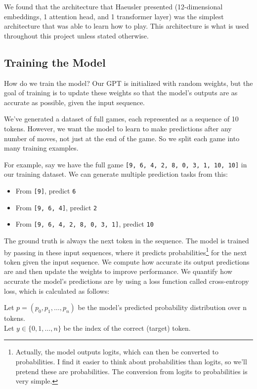 \documentclass[11pt]{article}
\providecommand{\tightlist}{%
      \setlength{\itemsep}{0pt}\setlength{\parskip}{0pt}}
\begin{document}
We found that the architecture that Haeusler presented (12-dimensional
embeddings, 1 attention head, and 1 transformer layer) was the simplest
architecture that was able to learn how to play. This architecture is
what is used throughout this project unless stated otherwise.

    \subsection{Training the Model}\label{training-the-model}

How do we train the model? Our GPT is initialized with random weights,
but the goal of training is to update these weights so that the model's
outputs are as accurate as possible, given the input sequence.

We've generated a dataset of full games, each represented as a sequence
of 10 tokens. However, we want the model to learn to make predictions
after any number of moves, not just at the end of the game. So we split
each game into many training examples.

For example, say we have the full game
\texttt{{[}9,\ 6,\ 4,\ 2,\ 8,\ 0,\ 3,\ 1,\ 10,\ 10{]}} in our training
dataset. We can generate multiple prediction tasks from this:

\begin{itemize}
\tightlist
\item
  From \texttt{{[}9{]}}, predict \texttt{6}
\item
  From \texttt{{[}9,\ 6,\ 4{]}}, predict \texttt{2}
\item
  From \texttt{{[}9,\ 6,\ 4,\ 2,\ 8,\ 0,\ 3,\ 1{]}}, predict \texttt{10}
\end{itemize}

The ground truth is always the next token in the sequence. The model is
trained by passing in these input sequences, where it predicts
probabilities\footnote{Actually, the model outputs logits, which can then be
converted to probabilities. I find it easier to think about
probabilities than logits, so we'll pretend these are probabilities.
The conversion from logits to probabilities is very simple.} for the next token given the input sequence. We
compute how accurate its output predictions are and then update the
weights to improve performance. We quantify how accurate the model's
predictions are by using a loss function called cross-entropy loss,
which is calculated as follows:

Let \(p = (p_0, p_1, \dots, p_{n})\) be the model's predicted
probability distribution over n tokens.\\
Let \(y \in \{0, 1, \dots, n\}\) be the index of the correct (target)
token.
\end{document}
